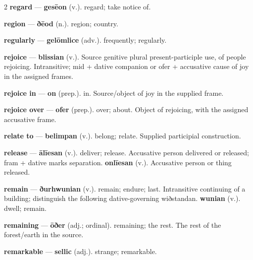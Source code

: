 \begin{multicols}{2}
\textbf{regard} — \textbf{gesēon} (v.). regard; take notice of.\par
\textbf{region} — \textbf{ðēod} (n.). region; country.\par
\textbf{regularly} — \textbf{gelōmlice} (adv.). frequently; regularly.\par
\textbf{rejoice} — \textbf{blissian} (v.). Source genitive plural present-participle use, of people rejoicing. Intransitive; mid + dative companion or ofer + accusative cause of joy in the assigned frames.\par
\textbf{rejoice in} — \textbf{on} (prep.). in. Source/object of joy in the supplied frame.\par
\textbf{rejoice over} — \textbf{ofer} (prep.). over; about. Object of rejoicing, with the assigned accusative frame.\par
\textbf{relate to} — \textbf{belimpan} (v.). belong; relate. Supplied participial construction.\par
\textbf{release} — \textbf{ālīesan} (v.). deliver; release. Accusative person delivered or released; fram + dative marks separation. \textbf{onlīesan} (v.). Accusative person or thing released.\par
\textbf{remain} — \textbf{ðurhwunian} (v.). remain; endure; last. Intransitive continuing of a building; distinguish the following dative-governing wiðstandan. \textbf{wunian} (v.). dwell; remain.\par
\textbf{remaining} — \textbf{ōðer} (adj.; ordinal). remaining; the rest. The rest of the forest/earth in the source.\par
\textbf{remarkable} — \textbf{sellic} (adj.). strange; remarkable.\par

\end{multicols}
